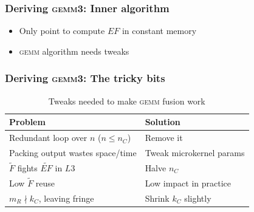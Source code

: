 \documentclass{beamer}
\newcommand*{\gemmt}{{\textsc{gemm3}}}
\newcommand*{\gemm}{{\textsc{gemm}}}
\begin{document}
\begin{frame}
  \frametitle{Deriving \gemmt{}: Inner algorithm}
  \begin{adjustbox}{max size={!}{0.5\textheight},center}
  \end{adjustbox}
  \begin{itemize}
  \item Only point to compute $EF$ in constant memory
  \item \gemm{} algorithm needs tweaks
  \end{itemize}

\end{frame}

\begin{frame}
  \frametitle{Deriving \gemmt{}: The tricky bits}
  \begin{table}
    \centering
    \begin{tabular}{l|l}
      Problem&Solution\\ \hline \hline
      Redundant loop over $n$ ($n \leq n_C$) & Remove it\\
      Packing output wastes space/time & Tweak microkernel params\\
      $\widetilde{F}$ fights $\widetilde{EF}$ in $L3$ & Halve $n_C$\\
      Low $\widetilde{F}$ reuse & Low impact in practice\\
      $m_R \nmid k_C$, leaving fringe & Shrink $k_C$ slightly\\
    \end{tabular}
    \caption{Tweaks needed to make \gemm{} fusion work}
    \label{tab:gemm3-issues}
  \end{table}
\end{frame}
\end{document}
